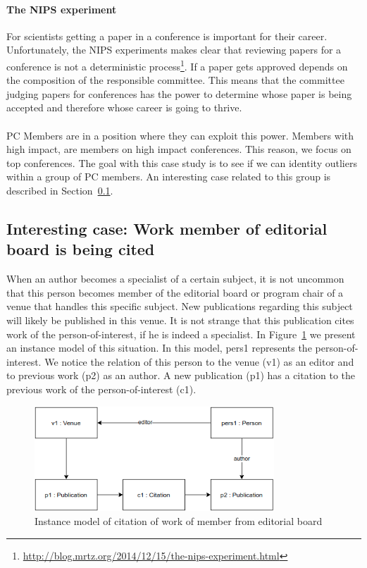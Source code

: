 \documentclass{ou-report}
\begin{document}
\paragraph{The NIPS experiment}
For scientists getting a paper in a conference is important for their career. 
Unfortunately, the NIPS experiments makes clear that reviewing papers for a 
conference is not a deterministic
process\footnote{\url{http://blog.mrtz.org/2014/12/15/the-nips-experiment.html}}.
If a paper gets approved depends on the composition of the 
responsible committee. This means that the committee judging papers for 
conferences has the power to determine whose paper is being accepted and 
therefore whose career is going to thrive.

\paragraph{}
PC Members are in a position where they can exploit this power. Members with
high impact, are members on high impact conferences. This reason, we focus on
top conferences. The goal with this case study is to see if we can identity outliers 
within a group of PC members.
An interesting case related to this group is described in 
Section~\ref{interesting_case:work_member_editorial_board_cited}.

\subsection{Interesting case: Work member of editorial board is being cited}
\label{interesting_case:work_member_editorial_board_cited}
When an author becomes a specialist of a certain subject, it is not uncommon 
that this person becomes member of the editorial board or program chair of a 
venue that handles this specific subject.
New publications regarding this subject will likely be published in this venue. 
It is not strange that this publication cites work of the person-of-interest, if 
he is indeed a specialist.
In Figure~\ref{fig:cweb} we present an instance model of this situation. In this 
model, pers1 represents the person-of-interest. We notice the relation of this 
person to the venue (v1) as an editor and to previous work (p2) as an author. A 
new publication (p1) has a citation to the previous work of the 
person-of-interest (c1).

\begin{figure}[H]
\centering
\includegraphics[width=9cm]{images/cite_work_editorial_board.drawio.png}
\caption{Instance model of citation of work of member from editorial board}
\label{fig:cweb}
\end{figure}
\end{document}
